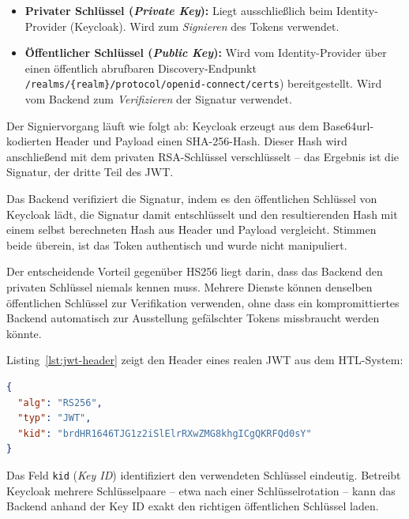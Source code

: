 \begin{itemize}
    \item \textbf{Privater Schlüssel (\textit{Private Key}):} Liegt
    ausschließlich beim Identity-Provider (Keycloak). Wird zum
    \textit{Signieren} des Tokens verwendet.
    \item \textbf{Öffentlicher Schlüssel (\textit{Public Key}):} Wird
    vom Identity-Provider über einen öffentlich abrufbaren
    Discovery-Endpunkt \\\texttt{/realms/\{realm\}/protocol/openid-connect/certs})
    bereitgestellt. Wird vom Backend zum \textit{Verifizieren} der
    Signatur verwendet.
\end{itemize}

Der Signiervorgang läuft wie folgt ab: Keycloak erzeugt aus dem
Base64url-kodierten Header und Payload einen SHA-256-Hash. Dieser Hash
wird anschließend mit dem privaten RSA-Schlüssel verschlüsselt -- das
Ergebnis ist die Signatur, der dritte Teil des JWT.~\cite{jwt-rfc}

Das Backend verifiziert die Signatur, indem es den öffentlichen Schlüssel
von Keycloak lädt, die Signatur damit entschlüsselt und den resultierenden
Hash mit einem selbst berechneten Hash aus Header und Payload vergleicht.
Stimmen beide überein, ist das Token authentisch und wurde nicht
manipuliert.~\cite{jwt-best-practices}

Der entscheidende Vorteil gegenüber HS256 liegt darin, dass das Backend
den privaten Schlüssel niemals kennen muss. Mehrere Dienste können
denselben öffentlichen Schlüssel zur Verifikation verwenden, ohne dass
ein kompromittiertes Backend automatisch zur Ausstellung gefälschter
Tokens missbraucht werden könnte.~\cite{jwt-best-practices}

Listing~\ref{lst:jwt-header} zeigt den Header eines realen JWT aus dem
HTL-System:

\begin{lstlisting}[language=json, caption={JWT Header -- RS256 Algorithmus mit Key ID},
                   label={lst:jwt-header}]
{
  "alg": "RS256",
  "typ": "JWT",
  "kid": "brdHR1646TJG1z2iSlElrRXwZMG8khgICgQKRFQd0sY"
}
\end{lstlisting}

Das Feld \texttt{kid} (\textit{Key ID}) identifiziert den verwendeten
Schlüssel eindeutig. Betreibt Keycloak mehrere Schlüsselpaare -- etwa
nach einer Schlüsselrotation -- kann das Backend anhand der Key ID
exakt den richtigen öffentlichen Schlüssel laden.~\cite{jwt-rfc}

